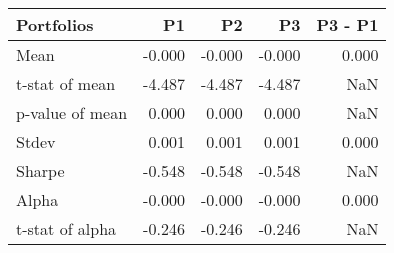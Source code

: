 \begin{tabular}{lrrrr}
\toprule
Portfolios & P1 & P2 & P3 & P3 - P1 \\
\midrule
Mean & -0.000 & -0.000 & -0.000 & 0.000 \\
t-stat of mean & -4.487 & -4.487 & -4.487 & NaN \\
p-value of mean & 0.000 & 0.000 & 0.000 & NaN \\
Stdev & 0.001 & 0.001 & 0.001 & 0.000 \\
Sharpe & -0.548 & -0.548 & -0.548 & NaN \\
Alpha & -0.000 & -0.000 & -0.000 & 0.000 \\
t-stat of alpha & -0.246 & -0.246 & -0.246 & NaN \\
\bottomrule
\end{tabular}
